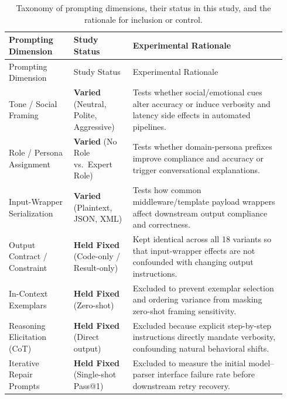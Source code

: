 \documentclass[a4paper,fleqn]{cas-sc}
\begin{document}
{\footnotesize
\begin{longtable}[]{@{}p{0.22\linewidth}p{0.20\linewidth}p{0.52\linewidth}@{}}
\caption{Taxonomy of prompting dimensions, their status in this study, and the rationale for inclusion or control.}\label{tab:prompt-dimensions}\tabularnewline
\toprule\noalign{}
Prompting Dimension & Study Status & Experimental Rationale \\
\midrule\noalign{}
\endfirsthead
\toprule\noalign{}
Prompting Dimension & Study Status & Experimental Rationale \\
\midrule\noalign{}
\endhead
\bottomrule\noalign{}
\endlastfoot
Tone / Social Framing \citep{li2023emotionprompt, yin2024politeness} & \textbf{Varied} (Neutral, Polite, Aggressive) & Tests whether social/emotional cues alter accuracy or induce verbosity and latency side effects in automated pipelines. \\
Role / Persona Assignment \citep{schulhoff2024promptreport, zhuo2024prosa} & \textbf{Varied} (No Role vs.\ Expert Role) & Tests whether domain-persona prefixes improve compliance and accuracy or trigger conversational explanations. \\
Input-Wrapper Serialization \citep{sclar2023spurious, liu2024structuredoutput} & \textbf{Varied} (Plaintext, JSON, XML) & Tests how common middleware/template payload wrappers affect downstream output compliance and correctness. \\
Output Contract / Constraint \citep{zhou2023ifeval, liu2024structuredoutput} & \textbf{Held Fixed} (Code-only / Result-only) & Kept identical across all 18 variants so that input-wrapper effects are not confounded with changing output instructions. \\
In-Context Exemplars \citep{brown2020fewshot, zhao2021calibrate, lu2021fantastically} & \textbf{Held Fixed} (Zero-shot) & Excluded to prevent exemplar selection and ordering variance from masking zero-shot framing sensitivity. \\
Reasoning Elicitation (CoT) \citep{wei2022cot, kojima2022zeroshot} & \textbf{Held Fixed} (Direct output) & Excluded because explicit step-by-step instructions directly mandate verbosity, confounding natural behavioral shifts. \\
Iterative Repair Prompts \citep{jimenez2024swebench} & \textbf{Held Fixed} (Single-shot Pass@1) & Excluded to measure the initial model--parser interface failure rate before downstream retry recovery. \\
\end{longtable}
}
\end{document}
